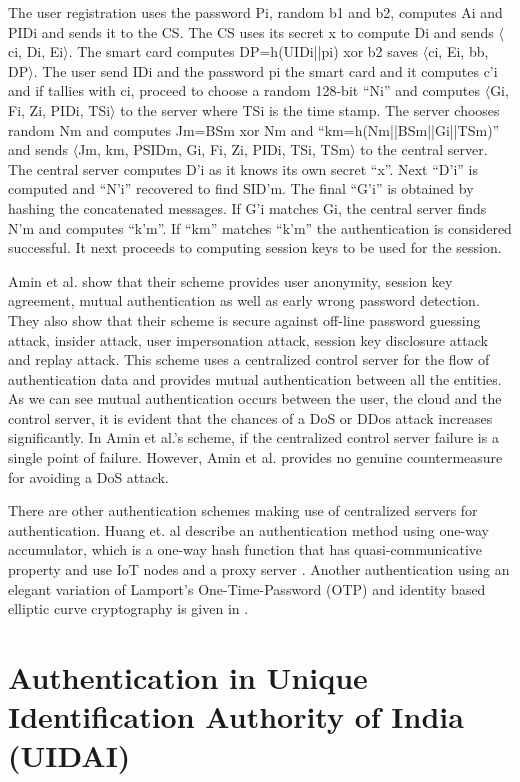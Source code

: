 \begin{multicols}{2}
The user registration uses the password Pi, random b1 and b2, computes Ai and PIDi and sends it to the CS. The CS uses its secret x to compute Di and sends $\langle$ci, Di, Ei$\rangle$. The smart card computes DP=h(UIDi||pi) xor b2 saves $\langle$ci, Ei, bb, DP$\rangle$. The user send IDi and the password pi the smart card and it computes c'i and if tallies with ci, proceed to choose a random 128-bit ``Ni'' and computes  $\langle$Gi, Fi, Zi, PIDi, TSi$\rangle$ to the server where TSi is the time stamp. The server chooses random Nm and computes Jm=BSm xor Nm and ``km=h(Nm||BSm||Gi||TSm)'' and sends $\langle$Jm, km, PSIDm, Gi, Fi, Zi, PIDi, TSi, TSm$\rangle$ to the central server. The central server computes D'i as it knows its own secret ``x''. Next ``D'i'' is computed and ``N'i'' recovered to find SID'm. The final ``G'i'' is obtained by hashing the concatenated messages. If G'i matches Gi, the central server finds N'm and computes ``k'm''. If ``km'' matches ``k'm'' the authentication is considered successful. It next proceeds to computing session keys to be used for the session.

Amin et al. show that their scheme provides user anonymity, session key agreement, mutual authentication as well as early wrong password detection. They also show that their scheme is secure against off-line password guessing attack, insider attack, user impersonation attack, session key disclosure attack and replay attack. This scheme uses a centralized control server for the flow of authentication data and provides mutual authentication between all the entities. As we can see mutual authentication occurs between the user, the cloud and the control server, it is evident that the chances of a DoS or DDos attack increases significantly. In Amin et al.'s scheme, if the centralized control server failure is a single point of failure. However, Amin et al. provides no genuine countermeasure for avoiding a DoS attack.  

There are other authentication schemes making use of centralized servers for authentication. Huang et. al describe an authentication method using one-way accumulator, which is a one-way hash function that has quasi-communicative property and use IoT nodes and a proxy server \cite{key22}. Another authentication using an elegant variation of Lamport's One-Time-Password (OTP) and identity based elliptic curve cryptography is given in \cite{key22}.

\section*{Authentication in Unique Identification Authority of India (UIDAI)}


\end{multicols}
